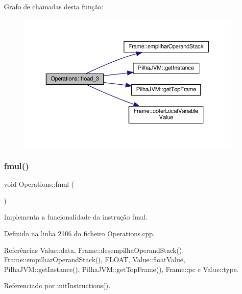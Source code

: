 Grafo de chamadas desta função\+:\nopagebreak
\begin{figure}[H]
\begin{center}
\leavevmode
\includegraphics[width=350pt]{classOperations_a1d7d4685fea35e0619ff468ed57a4f94_cgraph}
\end{center}
\end{figure}
\mbox{\label{classOperations_ad4caf68c912edd7bfac5c8d74c1e2036}} 
\subsubsection{\texorpdfstring{fmul()}{fmul()}}
{\footnotesize\ttfamily void Operations\+::fmul (\begin{DoxyParamCaption}{ }\end{DoxyParamCaption})\hspace{0.3cm}{\ttfamily [private]}}



Implementa a funcionalidade da instrução fmul. 



Definido na linha 2106 do ficheiro Operations.\+cpp.



Referências Value\+::data, Frame\+::desempilha\+Operand\+Stack(), Frame\+::empilhar\+Operand\+Stack(), F\+L\+O\+AT, Value\+::float\+Value, Pilha\+J\+V\+M\+::get\+Instance(), Pilha\+J\+V\+M\+::get\+Top\+Frame(), Frame\+::pc e Value\+::type.



Referenciado por init\+Instructions().


